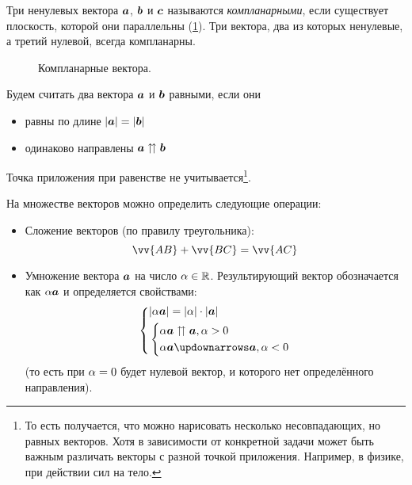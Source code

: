 \documentclass[a4paper,12pt]{article}
\begin{document}
  \begin{definition}[Компланарность]
    Три ненулевых вектора $\boldsymbol a$, $\boldsymbol b$ и $\boldsymbol c$ называются \emph{компланарными}, если существует плоскость, которой они параллельны (\ref{fig:coplanarity}).
    Три вектора, два из которых ненулевые, а третий нулевой, всегда компланарны.
  \end{definition}
  
  \begin{figure}[h]
    \centering
    
    
    \caption{Компланарные вектора.}
    \label{fig:coplanarity}
  \end{figure}
  
  \begin{definition}
    Будем считать два вектора $\boldsymbol a$ и $\boldsymbol b$ равными, если они
    \begin{itemize}
      \item равны по длине $|\boldsymbol a| = |\boldsymbol b|$
      \item одинаково направлены $\boldsymbol a \upuparrows \boldsymbol b$
    \end{itemize}
    Точка приложения при равенстве не учитывается\footnote{То есть получается, что можно нарисовать несколько несовпадающих, но равных векторов. Хотя в зависимости от конкретной задачи может быть важным различать векторы с разной точкой приложения. Например, в физике, при действии сил на тело.}.
  \end{definition}
  
  На множестве векторов можно определить следующие операции:
  \begin{itemize}
    \item Сложение векторов (по правилу треугольника):  %
      \[
        \vv{AB} + \vv{BC} = \vv{AC}
      \]
    \item Умножение вектора $\boldsymbol a$ на число $\alpha \in \operatorname{\mathbb R}$.
      Результирующий вектор обозначается как $\alpha \boldsymbol a$ и определяется свойствами:
      \[
        \left\{
          \begin{aligned}
            &|\alpha \bds a| = |\alpha| \cdot |\bds a|\\
            &\left\{
               \begin{aligned}
                 &\alpha \bds a \upuparrows \bds a, \alpha > 0\\
                 &\alpha \bds a \updownarrows \bds a, \alpha < 0
               \end{aligned}
             \right.
          \end{aligned}
        \right.
      \]
      (то есть при $\alpha \hm= 0$ будет нулевой вектор, и которого нет определённого направления).
  \end{itemize}
  
\end{document}
